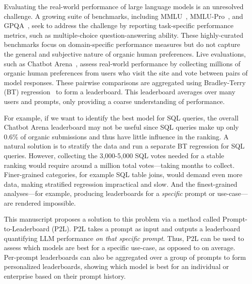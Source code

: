 Evaluating the real-world performance of large language models is an unresolved challenge.
A growing suite of benchmarks, including MMLU~\citep{hendrycks2020measuring}, MMLU-Pro~\citep{wang2024mmlu}, and GPQA~\citep{rein2023gpqa}, seek to address the challenge by reporting task-specific performance metrics, such as multiple-choice question-answering ability.
These highly-curated benchmarks focus on domain-specific performance measures but do not capture the general and subjective nature of organic human preferences.
Live evaluations, such as Chatbot Arena~\citep{chiang2024chatbot}, assess real-world performance by collecting millions of organic human preferences from users who visit the site and vote between pairs of model responses. 
These pairwise comparisons are aggregated using Bradley-Terry (BT) regression~\cite{bradley1952rank} to form a leaderboard.
This leaderboard averages over many users and prompts, only providing a coarse understanding of performance.

For example, if we want to identify the best model for SQL queries, the overall Chatbot Arena leaderboard may not be useful since SQL queries make up only 0.6\% of organic submissions and thus have little influence in the ranking. 
A natural solution is to stratify the data and run a separate BT regression for SQL queries. 
However, collecting the 3{,}000-5{,}000 SQL votes needed for a stable ranking would require around a million total votes---taking months to collect. 
Finer-grained categories, for example SQL table joins, would demand even more data, making stratified regression impractical and slow.
And the finest-grained analyses---for example, producing leaderboards for a \emph{specific} prompt or use-case---are rendered impossible.

This manuscript proposes a solution to this problem via a method called Prompt-to-Leaderboard (P2L).
P2L takes a prompt as input and outputs a leaderboard quantifying LLM performance \emph{on that specific prompt}.
Thus, P2L can be used to assess which models are best for a specific use-case, as opposed to on average.
Per-prompt leaderboards can also be aggregated over a group of prompts to form personalized leaderboards, showing which model is best for an individual or enterprise based on their prompt history.

